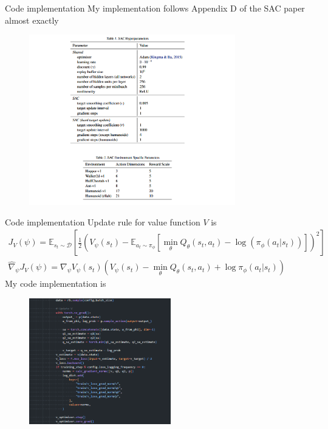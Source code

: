 \documentclass[8pt]{beamer}
\newcommand{\mbb}[1]{\mathbb{#1}}
\begin{document}
\begin{frame}{Code implementation}
    My implementation follows Appendix D of the SAC paper almost exactly
    \begin{figure}
        \centering
        \includegraphics[width=0.8\textwidth]{SACAppendixD.png}
    \end{figure}
\end{frame}

\begin{frame}{Code implementation}
    Update rule for value function $V$ is
    \[
    \begin{gathered}
        J_V(\psi) = \mbb{E}_{s_t \sim \mathcal{D}} \left[ \frac{1}{2}\left(V_\psi (s_t) - \mbb{E}_{a_t \sim \pi_\phi} \left[\min_{\theta} Q_{\theta} (s_t, a_t) - \log{(\pi_\phi (a_t |s_t))}\right]\right)^2\right] \\
        \hat{\nabla}_\psi J_V(\psi) = \nabla_\psi V_\psi (s_t) \left(V_\psi (s_t) - \min_\theta Q_\theta (s_t, a_t) + \log{\pi_\phi (a_t|s_t)}\right)
    \end{gathered}
    \]
    My code implementation is
    \begin{figure}
        \centering
        \includegraphics[width=0.55\textwidth]{fig5.png}
    \end{figure}
\end{frame}
\end{document}
